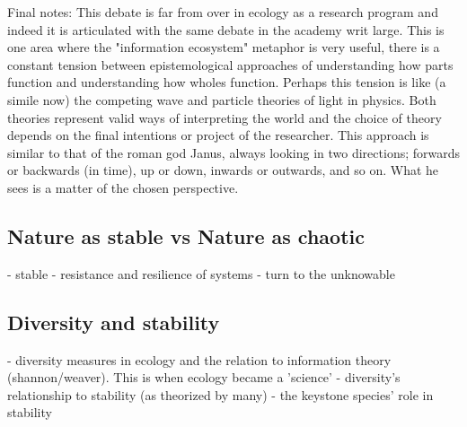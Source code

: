 Final notes: This debate is far from over in ecology as a research program and indeed it is articulated with the same debate in the academy writ large. This is one area where the "information ecosystem" metaphor is very useful, there is a constant tension between epistemological approaches of understanding how  parts function and understanding how wholes function. Perhaps this tension is like (a simile now) the competing wave and particle theories of light in physics. Both theories represent valid ways of interpreting the world and the choice of theory depends on the final intentions or project of the researcher. This approach is similar to that of the roman god Janus, always looking in two directions; forwards or backwards (in time), up or down, inwards or outwards, and so on. What he sees is a matter of the chosen perspective. 

\subsection{Nature as stable vs Nature as chaotic}

- stable \cite{odum_1953} 
- resistance and resilience of systems \cite{holling_1973}
- turn to the unknowable\cite{barbour_1996}

\subsection{Diversity and stability}

- diversity measures in ecology and the relation to information theory (shannon/weaver). This is when ecology became a 'science'
- diversity's relationship to stability (as theorized by many)
- the keystone species' role in stability


